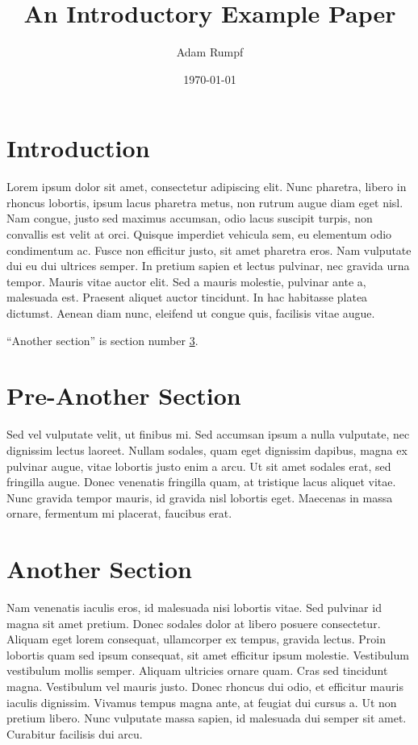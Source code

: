 \documentclass[12pt]{article}
\title{An Introductory Example Paper}
\author{Adam Rumpf}
\date{\today}
\begin{document}
\maketitle

\section{Introduction}
\label{sec:intro}

Lorem ipsum dolor sit amet, consectetur adipiscing elit. Nunc pharetra, libero in rhoncus lobortis, ipsum lacus pharetra metus, non rutrum augue diam eget nisl. Nam congue, justo sed maximus accumsan, odio lacus suscipit turpis, non convallis est velit at orci. Quisque imperdiet vehicula sem, eu elementum odio condimentum ac. Fusce non efficitur justo, sit amet pharetra eros. Nam vulputate dui eu dui ultrices semper. In pretium sapien et lectus pulvinar, nec gravida urna tempor. Mauris vitae auctor elit. Sed a mauris molestie, pulvinar ante a, malesuada est. Praesent aliquet auctor tincidunt. In hac habitasse platea dictumst. Aenean diam nunc, eleifend ut congue quis, facilisis vitae augue.

``Another section'' is section number \ref{sec:another}.

\section{Pre-Another Section}

Sed vel vulputate velit, ut finibus mi. Sed accumsan ipsum a nulla vulputate, nec dignissim lectus laoreet. Nullam sodales, quam eget dignissim dapibus, magna ex pulvinar augue, vitae lobortis justo enim a arcu. Ut sit amet sodales erat, sed fringilla augue. Donec venenatis fringilla quam, at tristique lacus aliquet vitae. Nunc gravida tempor mauris, id gravida nisl lobortis eget. Maecenas in massa ornare, fermentum mi placerat, faucibus erat.

\section{Another Section}
\label{sec:another}

Nam venenatis iaculis eros, id malesuada nisi lobortis vitae. Sed pulvinar id magna sit amet pretium. Donec sodales dolor at libero posuere consectetur. Aliquam eget lorem consequat, ullamcorper ex tempus, gravida lectus. Proin lobortis quam sed ipsum consequat, sit amet efficitur ipsum molestie. Vestibulum vestibulum mollis semper. Aliquam ultricies ornare quam. Cras sed tincidunt magna. Vestibulum vel mauris justo. Donec rhoncus dui odio, et efficitur mauris iaculis dignissim. Vivamus tempus magna ante, at feugiat dui cursus a. Ut non pretium libero. Nunc vulputate massa sapien, id malesuada dui semper sit amet. Curabitur facilisis dui arcu.
\end{document}

